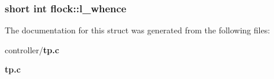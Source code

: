 \subsubsection[{l\_\-whence}]{\setlength{\rightskip}{0pt plus 5cm}short int {\bf flock::l\_\-whence}}\label{structflock_ad5898a4a2992bb3c599764d76e02767b}


The documentation for this struct was generated from the following files:\begin{DoxyCompactItemize}
\item 
controller/{\bf tp.c}\item 
{\bf tp.c}\end{DoxyCompactItemize}
